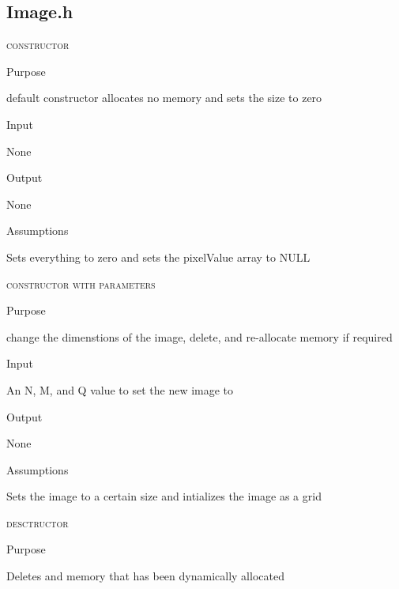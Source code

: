 \documentclass[pdftex, 11pt]{article}
\begin{document}
\subsection{Image.h}
\begin{description}

	\item{\textsc{constructor}}
		\begin{description}
			\item{Purpose}

				default constructor allocates no memory and sets the size to zero 

			\item{Input}

				None

			\item{Output}

				None

			\item{Assumptions}

				Sets everything to zero and 
				sets the pixelValue array to NULL


		\end{description}


	\item{\textsc{constructor with parameters}}
		\begin{description}
			\item{Purpose}

				change the dimenstions of the image, delete,
				and re-allocate memory if required

			\item{Input}

				An N, M, and Q value to set the new image to

			\item{Output}

				None

			\item{Assumptions}

				Sets the image to a certain size and intializes the
				image as a grid

		\end{description}



	\item{\textsc{desctructor}}
		\begin{description}
			\item{Purpose}

				Deletes and memory that has been dynamically allocated


\end{description}
\end{description}
\end{document}
